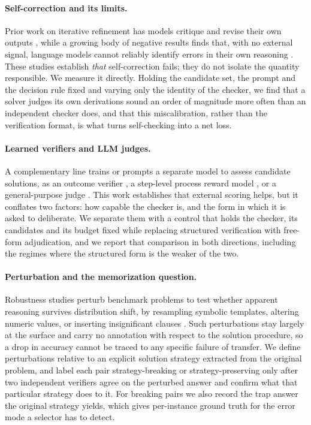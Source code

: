 \documentclass[letterpaper]{article} %
\begin{document}
\paragraph{Self-correction and its limits.}
Prior work on iterative refinement has models critique and revise their own
outputs \cite{madaan2023self, shinn2023reflexion}, while a growing body of
negative results finds that, with no external signal, language models cannot
reliably identify errors in their own reasoning \cite{huang2024large}. These
studies establish \emph{that} self-correction fails; they do not isolate the
quantity responsible. We measure it directly. Holding the candidate set, the
prompt and the decision rule fixed and varying only the identity of the checker,
we find that a solver judges its own derivations sound an order of magnitude
more often than an independent checker does, and that this miscalibration, rather
than the verification format, is what turns self-checking into a net loss.

\paragraph{Learned verifiers and LLM judges.}
A complementary line trains or prompts a separate model to assess candidate
solutions, as an outcome verifier \cite{cobbe2021training}, a step-level process
reward model \cite{lightman2024let}, or a general-purpose judge
\cite{zheng2023judging}. This work establishes that external scoring helps, but
it conflates two factors: how capable the checker is, and the form in which it
is asked to deliberate. We separate them with a control that holds the checker,
its candidates and its budget fixed while replacing structured verification with
free-form adjudication, and we report that comparison in both directions,
including the regimes where the structured form is the weaker of the two.

\paragraph{Perturbation and the memorization question.}
Robustness studies perturb benchmark problems to test whether apparent reasoning
survives distribution shift, by resampling symbolic templates, altering numeric
values, or inserting insignificant clauses \cite{mirzadeh2025gsm}. Such
perturbations stay largely at the surface and carry no annotation with respect to
the solution procedure, so a drop in accuracy cannot be traced to any
specific failure of transfer. We define perturbations relative to an explicit
solution strategy extracted from the original problem, and label each pair
strategy-breaking or strategy-preserving only after two independent verifiers
agree on the perturbed answer and confirm what that particular strategy does to it.
For breaking pairs we also record the trap answer the original strategy
yields, which gives per-instance ground truth for the error mode a selector has to
detect.
\end{document}
